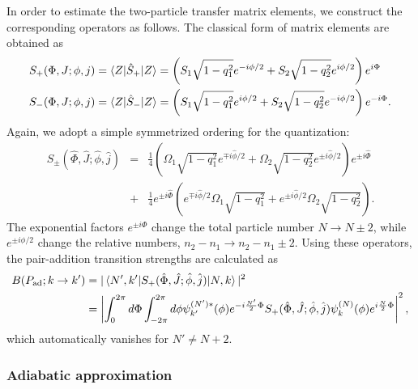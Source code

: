 \documentclass[%
superscriptaddress,
preprint,
showpacs,
nofootinbib,
amsmath,amssymb,
prc,
floatfix ]%
{revtex4-1}
\begin{document}
In order to estimate the two-particle transfer matrix elements,
we construct the corresponding operators as follows.
The classical form of matrix elements are obtained as
\begin{align}
  S_+(\Phi,J;\phi,j) &= \braket{Z|\hat{S}_+|Z} = \left( S_1\sqrt{1-q_1^2}e^{-i\phi/2}+S_2\sqrt{1-q_2^2}e^{i\phi/2} \right) e^{i\Phi}
	\label{Sp_mean_value} \\
  S_-(\Phi,J;\phi,j) &= \braket{Z|\hat{S}_-|Z} = \left( S_1\sqrt{1-q_1^2}e^{i\phi/2}+S_2\sqrt{1-q_2^2}e^{-i\phi/2} \right) e^{-i\Phi} .
	\label{Sm_mean_value}
\end{align}
Again, we adopt a simple symmetrized ordering for the quantization:
\begin{eqnarray}
  S_\pm (\hat{\Phi},\hat{J};\hat{\phi},\hat{j})
	&=& \frac{1}{4}\left( \Omega_1\sqrt{1-q_1^2}e^{\mp i\hat{\phi}/2}
+\Omega_2\sqrt{1-q_2^2}e^{\pm i\hat{\phi}/2} \right) e^{\pm i\hat{\Phi}} 
	\nonumber \\
&+ & \frac{1}{4}e^{\pm i\hat{\Phi}}\left( 
e^{\mp i\hat{\phi}/2}\Omega_1\sqrt{1-q_1^2}
+e^{\pm i\hat{\phi}/2}\Omega_2\sqrt{1-q_2^2} \right) .
\end{eqnarray}
The exponential factors $e^{\pm i\Phi}$ change
the total particle number $N\rightarrow N\pm 2$,
while $e^{\pm i\phi/2}$ change the relative numbers,
$n_2-n_1 \rightarrow n_2-n_1 \pm 2$.
Using these operators,
the pair-addition transition strengths are calculated as
\begin{align}
B(P_{\rm ad};k\rightarrow k') &=
|\braket{N',k'|S_+(\hat{\Phi},\hat{J};\hat{\phi},\hat{j})|N,k}|^2
	\nonumber \\
&= \left| \int_{0}^{2\pi}d\Phi \int_{-2\pi}^{2\pi}d\phi 
	\psi^{(N')*}_{k'}(\phi) e^{-i\frac{N'}{2}\Phi}
	S_+(\hat{\Phi},\hat{J};\hat{\phi},\hat{j})
	\psi^{(N)}_{k}(\phi)e^{i\frac{N}{2}\Phi} \right|^2,
\end{align}
which automatically vanishes for $N'\neq N+2$.

\subsubsection{Adiabatic approximation}
\label{subsec:canonical2}
\end{document}
